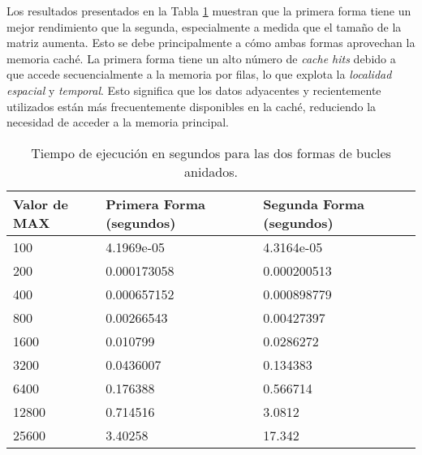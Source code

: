 \documentclass[conference]{IEEEtran}
\begin{document}
Los resultados presentados en la Tabla \ref{tabla1} muestran que la primera forma tiene un mejor 
rendimiento que la segunda, especialmente a medida que el tamaño de la matriz aumenta. Esto se debe
 principalmente a cómo ambas formas aprovechan la memoria caché. La primera forma tiene un alto número 
 de \textit{cache hits} debido a que accede secuencialmente a la memoria por filas, lo que explota la
  \textit{localidad espacial} y \textit{temporal}. Esto significa que los datos adyacentes y recientemente 
  utilizados están más frecuentemente disponibles en la caché, reduciendo la necesidad de acceder a la memoria principal.
\begin{table}[h!]
    \centering
    \begin{tabularx}{250pt}{|X|X|X|}
        \hline

        \textbf{Valor de MAX} & \textbf{Primera Forma (segundos)} & \textbf{Segunda Forma (segundos)} \\ \hline
        100                   & 4.1969e-05                        & 4.3164e-05                        \\ \hline
        200                   & 0.000173058                       & 0.000200513                       \\ \hline
        400                   & 0.000657152                       & 0.000898779                       \\ \hline
        800                   & 0.00266543                        & 0.00427397                        \\ \hline
        1600                  & 0.010799                          & 0.0286272                         \\ \hline
        3200                  & 0.0436007                         & 0.134383                          \\ \hline
        6400                  & 0.176388                          & 0.566714                          \\ \hline
        12800                 & 0.714516                          & 3.0812                            \\ \hline
        25600                 & 3.40258                           & 17.342                            \\ \hline
    \end{tabularx}
    \caption{Tiempo de ejecución en segundos para las dos formas de bucles anidados.}
    \label{tabla1}
\end{table}
\end{document}
